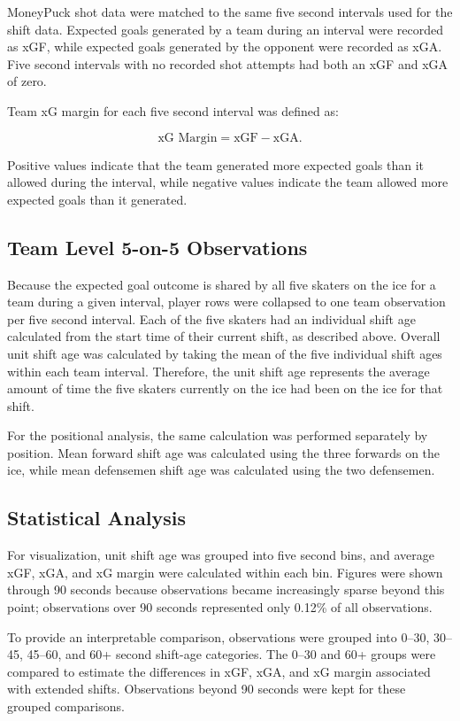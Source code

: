 \documentclass[
  12pt]{article}
\begin{document}
MoneyPuck shot data were matched to the same five second intervals used
for the shift data. Expected goals generated by a team during an
interval were recorded as xGF, while expected goals generated by the
opponent were recorded as xGA. Five second intervals with no recorded
shot attempts had both an xGF and xGA of zero.

Team xG margin for each five second interval was defined as:

\[
\text{xG Margin} = \text{xGF} - \text{xGA}.
\]

Positive values indicate that the team generated more expected goals
than it allowed during the interval, while negative values indicate the
team allowed more expected goals than it generated.

\subsection{Team Level 5-on-5
Observations}\label{team-level-5-on-5-observations}

Because the expected goal outcome is shared by all five skaters on the
ice for a team during a given interval, player rows were collapsed to
one team observation per five second interval. Each of the five skaters
had an individual shift age calculated from the start time of their
current shift, as described above. Overall unit shift age was calculated
by taking the mean of the five individual shift ages within each team
interval. Therefore, the unit shift age represents the average amount of
time the five skaters currently on the ice had been on the ice for that
shift.

For the positional analysis, the same calculation was performed
separately by position. Mean forward shift age was calculated using the
three forwards on the ice, while mean defensemen shift age was
calculated using the two defensemen.

\subsection{Statistical Analysis}\label{statistical-analysis}

For visualization, unit shift age was grouped into five second bins, and
average xGF, xGA, and xG margin were calculated within each bin. Figures
were shown through 90 seconds because observations became increasingly
sparse beyond this point; observations over 90 seconds represented only
0.12\% of all observations.

To provide an interpretable comparison, observations were grouped into
0--30, 30--45, 45--60, and 60+ second shift-age categories. The 0--30
and 60+ groups were compared to estimate the differences in xGF, xGA,
and xG margin associated with extended shifts. Observations beyond 90
seconds were kept for these grouped comparisons.
\end{document}
